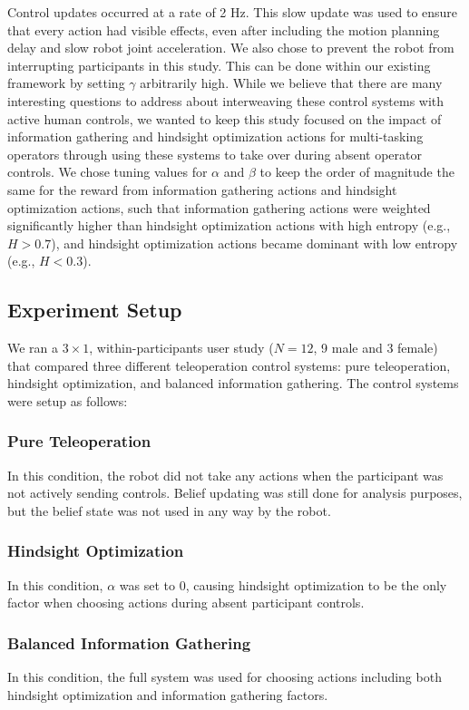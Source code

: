 \documentclass[conference]{IEEEtran}
\begin{document}
Control updates occurred at a rate of 2 Hz. This slow update was used to ensure that every action had visible effects, even after including the motion planning delay and slow robot joint acceleration. We also chose to prevent the robot from interrupting participants in this study. This can be done within our existing framework by setting $\gamma$ arbitrarily high. While we believe that there are many interesting questions to address about interweaving these control systems with active human controls, we wanted to keep this study focused on the impact of information gathering and hindsight optimization actions for multi-tasking operators through using these systems to take over during absent operator controls. We chose tuning values for $\alpha$ and $\beta$ to keep the order of magnitude the same for the reward from information gathering actions and hindsight optimization actions, such that information gathering actions were weighted significantly higher than hindsight optimization actions with high entropy (e.g., $H > 0.7$), and hindsight optimization actions became dominant with low entropy (e.g., $H < 0.3$).

\subsection{Experiment Setup}

We ran a $3 \times 1$, within-participants user study ($N = 12$, 9 male and 3 female) that compared three different teleoperation control systems: pure teleoperation, hindsight optimization, and balanced information gathering. The control systems were setup as follows:

\subsubsection{Pure Teleoperation}
In this condition, the robot did not take any actions when the participant was not actively sending controls. Belief updating was still done for analysis purposes, but the belief state was not used in any way by the robot.
\subsubsection{Hindsight Optimization}
In this condition, $\alpha$ was set to 0, causing hindsight optimization to be the only factor when choosing actions during absent participant controls.
\subsubsection{Balanced Information Gathering}
In this condition, the full system was used for choosing actions including both hindsight optimization and information gathering factors.
\end{document}
